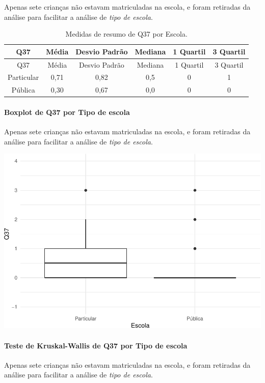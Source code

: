 \documentclass[]{article}
\let\oldparagraph\paragraph
\renewcommand{\paragraph}[1]{\oldparagraph{#1}\mbox{}}
\begin{document}
Apenas sete crianças não estavam matriculadas na escola, e foram retiradas da análise para facilitar a análise de \emph{tipo de escola}.

\begin{longtable}[]{@{}cccccc@{}}
\caption{\label{tab:unnamed-chunk-1414}Medidas de resumo de Q37 por Escola.}\tabularnewline
\toprule
Q37 & Média & Desvio Padrão & Mediana & 1 Quartil & 3 Quartil\tabularnewline
\midrule
\endfirsthead
\toprule
Q37 & Média & Desvio Padrão & Mediana & 1 Quartil & 3 Quartil\tabularnewline
\midrule
\endhead
Particular & 0,71 & 0,82 & 0,5 & 0 & 1\tabularnewline
Pública & 0,30 & 0,67 & 0,0 & 0 & 0\tabularnewline
\bottomrule
\end{longtable}

\hypertarget{boxplot-de-q37-por-tipo-de-escola}{%
\paragraph{Boxplot de Q37 por Tipo de escola}\label{boxplot-de-q37-por-tipo-de-escola}}

Apenas sete crianças não estavam matriculadas na escola, e foram retiradas da análise para facilitar a análise de \emph{tipo de escola}.

\begin{center}\includegraphics[width=0.75\linewidth]{relatorio_covid19_files/figure-latex/unnamed-chunk-1415-1} \end{center}

\hypertarget{teste-de-kruskal-wallis-de-q37-por-tipo-de-escola}{%
\paragraph{Teste de Kruskal-Wallis de Q37 por Tipo de escola}\label{teste-de-kruskal-wallis-de-q37-por-tipo-de-escola}}

Apenas sete crianças não estavam matriculadas na escola, e foram retiradas da análise para facilitar a análise de \emph{tipo de escola}.
\end{document}
